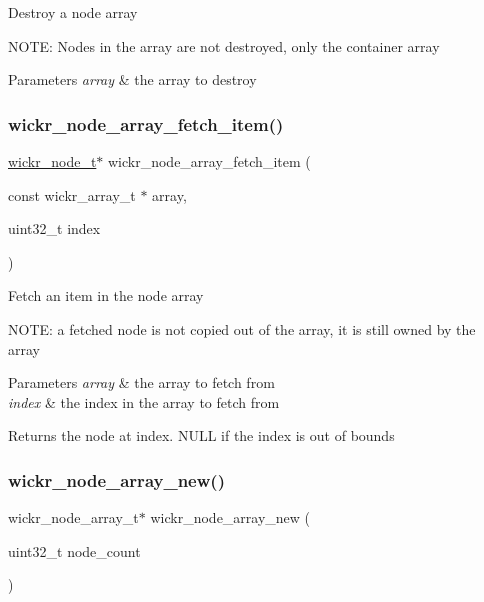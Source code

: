 Destroy a node array

N\+O\+TE\+: Nodes in the array are not destroyed, only the container array


\begin{DoxyParams}{Parameters}
{\em array} & the array to destroy \\
\hline
\end{DoxyParams}
\mbox{\label{group__wickr__node_ga878a3015abc8563d512c0e5acf10df60}} 
\subsubsection{\texorpdfstring{wickr\_node\_array\_fetch\_item()}{wickr\_node\_array\_fetch\_item()}}
{\footnotesize\ttfamily \mbox{\hyperlink{structwickr__node}{wickr\+\_\+node\+\_\+t}}$\ast$ wickr\+\_\+node\+\_\+array\+\_\+fetch\+\_\+item (\begin{DoxyParamCaption}\item[{const wickr\+\_\+array\+\_\+t $\ast$}]{array,  }\item[{uint32\+\_\+t}]{index }\end{DoxyParamCaption})}

Fetch an item in the node array

N\+O\+TE\+: a fetched node is not copied out of the array, it is still owned by the array


\begin{DoxyParams}{Parameters}
{\em array} & the array to fetch from \\
\hline
{\em index} & the index in the array to fetch from \\
\hline
\end{DoxyParams}
\begin{DoxyReturn}{Returns}
the node at \textquotesingle{}index\textquotesingle{}. N\+U\+LL if the index is out of bounds 
\end{DoxyReturn}
\mbox{\label{group__wickr__node_ga504ebe707aa003032c4ac8044d73ee92}} 
\subsubsection{\texorpdfstring{wickr\_node\_array\_new()}{wickr\_node\_array\_new()}}
{\footnotesize\ttfamily wickr\+\_\+node\+\_\+array\+\_\+t$\ast$ wickr\+\_\+node\+\_\+array\+\_\+new (\begin{DoxyParamCaption}\item[{uint32\+\_\+t}]{node\+\_\+count }\end{DoxyParamCaption})}

